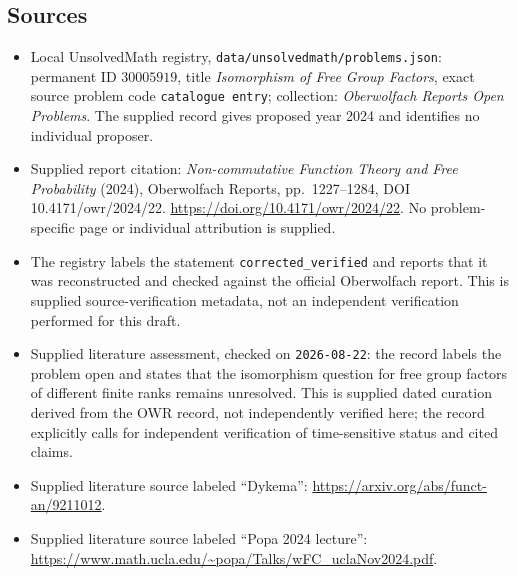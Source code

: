 \documentclass[11pt]{article}
\begin{document}
\subsection{Sources}
\begin{itemize}
\item Local UnsolvedMath registry, \texttt{data/unsolvedmath/problems.json}: permanent ID \(30005919\), title \emph{Isomorphism of Free Group Factors}, exact source problem code \texttt{catalogue entry}; collection: \emph{Oberwolfach Reports Open Problems}. The supplied record gives proposed year 2024 and identifies no individual proposer.
\item Supplied report citation: \emph{Non-commutative Function Theory and Free Probability} (2024), Oberwolfach Reports, pp.~1227--1284, DOI 10.4171/owr/2024/22. \url{https://doi.org/10.4171/owr/2024/22}. No problem-specific page or individual attribution is supplied.
\item The registry labels the statement \texttt{corrected\_verified} and reports that it was reconstructed and checked against the official Oberwolfach report. This is supplied source-verification metadata, not an independent verification performed for this draft.
\item Supplied literature assessment, checked on \texttt{2026-08-22}: the record labels the problem open and states that the isomorphism question for free group factors of different finite ranks remains unresolved. This is supplied dated curation derived from the OWR record, not independently verified here; the record explicitly calls for independent verification of time-sensitive status and cited claims.
\item Supplied literature source labeled ``Dykema'': \url{https://arxiv.org/abs/funct-an/9211012}.
\item Supplied literature source labeled ``Popa 2024 lecture'': \url{https://www.math.ucla.edu/~popa/Talks/wFC_uclaNov2024.pdf}.
\end{itemize}
\end{document}
